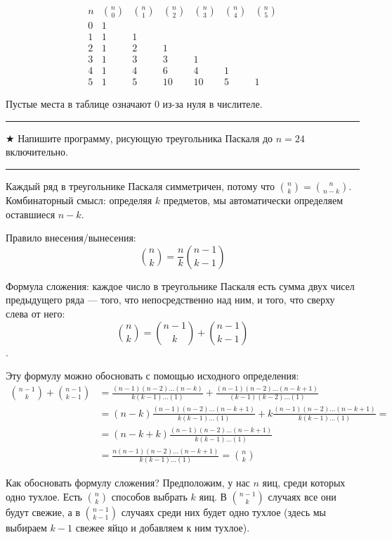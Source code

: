 \documentclass[14pt]{book}
\newenvironment{task}
 { \vspace{2ex}\hrule\vspace{2ex}$\bigstar$ }
 { \vspace{2ex}\hrule\vspace{2ex} }
\begin{document}
$$
 \begin{array}{ccccccc}
 n & \binom{n}{0} & \binom{n}{1} & \binom{n}{2} & \binom{n}{3} & \binom{n}{4} & \binom{n}{5} \\
 0 & 1 \\
 1 & 1 & 1 \\
 2 &  1 & 2 & 1 \\
 3 & 1 & 3 & 3 & 1 \\
 4 & 1 & 4 & 6 & 4 & 1 \\
 5 & 1 & 5 & 10 & 10 & 5 & 1
 \end{array}
$$

Пустые места в таблице означают $0$ из-за нуля в числителе.

\begin{task}
Напишите программу, рисующую треугольника Паскаля до $n=24$ включительно.
\end{task}

Каждый ряд в треугольнике Паскаля симметричен, потому что $\binom{n}{k}=\binom{n}{n-k}$.
Комбинаторный смысл: определяя $k$ предметов, мы автоматически определяем оставшиеся $n-k$.

Правило внесения/вынесения:
$$\binom{n}{k} = \frac{n}{k}\binom{n-1}{k-1}$$

Формула сложения: каждое число в треугольнике Паскаля есть сумма двух чисел предыдущего ряда ---
того, что непосредственно над ним, и того, что сверху слева от него:
$$\binom{n}{k} = \binom{n-1}{k} + \binom{n-1}{k-1}$$.

Эту формулу можно обосновать с помощью исходного определения:
\begin{align*}
  \binom{n-1}{k} + \binom{n-1}{k-1} 
  &= \frac{(n-1)(n-2)\ldots(n-k)}{k(k-1)\ldots(1)} 
     + \frac{(n-1)(n-2)\ldots(n-k+1)}{(k-1)(k-2)\ldots(1)}  \\
  &= (n-k)\frac{(n-1)(n-2)\ldots(n-k+1)}{k(k-1)\ldots(1)} 
     + k\frac{(n-1)(n-2)\ldots(n-k+1)}{k(k-1)\ldots(1)} = \\
  &= (n-k+k)\frac{(n-1)(n-2)\ldots(n-k+1)}{k(k-1)\ldots(1)} \\
  &= \frac{n(n-1)(n-2)\ldots(n-k+1)}{k(k-1)\ldots(1)} = \binom{n}{k}
\end{align*}

Как обосновать формулу сложения? Предположим, у нас $n$ яиц, среди которых
одно тухлое. Есть $\binom{n}{k}$ способов выбрать $k$ яиц. В $\binom{n-1}{k}$
случаях все они будут свежие, а в $\binom{n-1}{k-1}$ случаях среди них будет
одно тухлое (здесь мы выбираем $k-1$ свежее яйцо и добавляем к ним тухлое).
\end{document}
